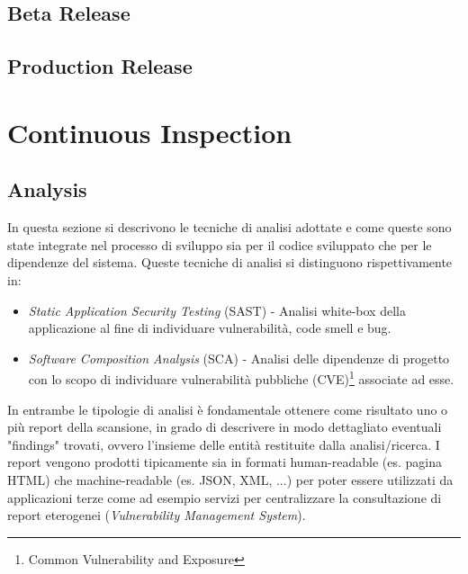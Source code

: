 \subsection{Beta Release}

\subsection{Production Release}

\section{Continuous Inspection}
\subsection{Analysis}
In questa sezione si descrivono le tecniche di analisi adottate e come queste sono state integrate nel processo di sviluppo sia per il codice sviluppato che per le dipendenze del sistema. Queste tecniche di analisi si distinguono rispettivamente in:
\begin{itemize}
    \item \textit{Static Application Security Testing} (SAST) - Analisi white-box della applicazione al fine di individuare vulnerabilità, code smell e bug.
    \item \textit{Software Composition Analysis} (SCA) - Analisi delle dipendenze di progetto con lo scopo di individuare vulnerabilità pubbliche (CVE)\footnote{Common Vulnerability and Exposure} associate ad esse.
\end{itemize}
In entrambe le tipologie di analisi è fondamentale ottenere come risultato uno o più report della scansione, in grado di descrivere in modo dettagliato eventuali "findings" trovati, ovvero l'insieme delle entità restituite dalla analisi/ricerca. I report vengono prodotti tipicamente sia in formati human-readable (es. pagina HTML) che machine-readable (es. JSON, XML, ...) per poter essere utilizzati da applicazioni terze come ad esempio servizi per centralizzare la consultazione di report eterogenei (\textit{Vulnerability Management System}).

